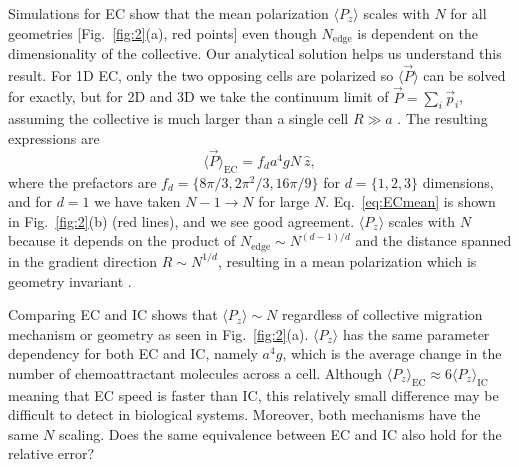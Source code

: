 Simulations for EC show that the mean polarization $\langle P_z \rangle$ scales with $N$ for all geometries [Fig.\ \ref{fig:2}(a), red points] even though $N_\text{edge}$ is dependent on the dimensionality of the collective. Our analytical solution helps us understand this result. For 1D EC, only the two opposing cells are polarized so $\langle\vec{P}\rangle$ can be solved for exactly, but for 2D and 3D we take the continuum limit of
$\vec{P} = \sum_i \vec{p}_i$,
assuming the collective is much larger than a single cell $R \gg a$ \cite{supinfo}. The resulting expressions are
\begin{equation} \label{eq:ECmean}
    \langle \vec{P} \rangle_\text{EC} = f_d a^4gN \ \hat{z},
\end{equation}
where the prefactors are $f_d = \{8\pi/3, 2\pi^2/3, 16\pi/9\}$ for $d=\{1,2,3\}$ dimensions, and for $d=1$ we have taken $N-1\to N$ for large $N$. Eq.\ \ref{eq:ECmean} is shown in Fig.\ \ref{fig:2}(b) (red lines), and we see good agreement. $\langle P_z \rangle$ scales with $N$ because it depends on the product of
$N_\text{edge} \sim N^{(d-1)/d}$
and the distance spanned in the gradient direction
$R \sim N^{1/d}$,
resulting in a mean polarization which is geometry invariant \cite{malet2015collective}.

Comparing EC and IC shows that $\langle P_z \rangle \sim N$ regardless of collective migration mechanism or geometry as seen in Fig.\ \ref{fig:2}(a). $\langle P_z \rangle$ has the same parameter dependency for both EC and IC, namely $a^4g$, which is the average change in the number of chemoattractant molecules across a cell. Although
$\langle P_z \rangle_\text{EC} \approx 6 \langle P_z \rangle_\text{IC}$
meaning that EC speed is faster than IC, this relatively small difference may be difficult to detect in biological systems. Moreover, both mechanisms have the same $N$ scaling.
Does the same equivalence between EC and IC also hold for the relative error?

